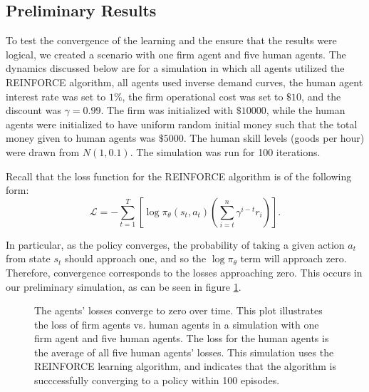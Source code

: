 \documentclass[twoside,twocolumn]{article}
\begin{document}
\subsection{Preliminary Results}

To test the convergence of the learning and the ensure that the results were logical, we created a scenario with one firm agent and five human agents. The dynamics discussed below are for a simulation in which all agents utilized the REINFORCE algorithm, all agents used inverse demand curves, the human agent interest rate was set to $1\%$, the firm operational cost was set to $\$10$, and the discount was $\gamma = 0.99$. The firm was initialized with $\$10000$, while the human agents were initialized to have uniform random initial money such that the total money given to human agents was $\$5000$. The human skill levels (goods per hour) were drawn from $N(1, 0.1)$. The simulation was run for 100 iterations. 

\medskip 

Recall that the loss function for the REINFORCE algorithm is of the following form:
\[
  \mathcal{L} = -\sum_{t = 1}^T \left[\log \pi_\theta(s_t, a_t) \left( \sum_{i = t}^n \gamma^{i - t}r_i \right) \right].  
\]

In particular, as the policy converges, the probability of taking a given action $a_t$ from state $s_t$ should approach one, and so the $\log \pi_\theta$ term will approach zero. Therefore, convergence corresponds to the losses approaching zero. This occurs in our preliminary simulation, as can be seen in figure \ref{plt:losstozero}.

\begin{figure}[h]
\caption{The agents' losses converge to zero over time. This plot illustrates the loss of firm agents vs. human agents in a simulation with one firm agent and five human agents. The loss for the human agents is the average of all five human agents' losses. This simulation uses the REINFORCE learning algorithm, and indicates that the algorithm is succcessfully converging to a policy within 100 episodes.}
\label{plt:losstozero}
\end{figure}
\end{document}
